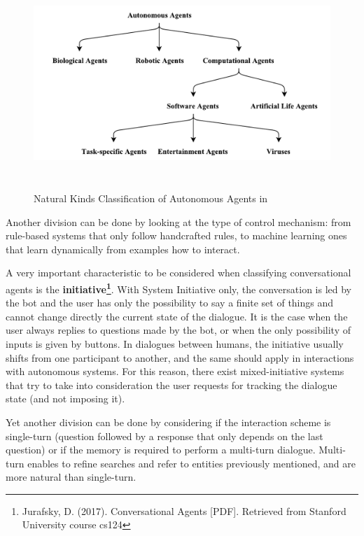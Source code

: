 
\begin{figure}[!htbp]
    \centering
    \includegraphics[max width=\linewidth,max height=8cm,keepaspectratio]{figures/franklinClassification}
    \caption{Natural Kinds Classification of Autonomous Agents in~\cite{franklin1996agent}}\label{fig:franklinClassification}
\end{figure}

Another division can be done by looking at the type of control mechanism: from rule-based systems that only follow handcrafted rules, to machine learning ones that learn dynamically from examples how to interact.

A very important characteristic to be considered when classifying conversational agents is the \textbf{initiative\footnote{ Jurafsky, D. (2017). Conversational Agents [PDF]. Retrieved from Stanford University course cs124 }}. With System Initiative only, the conversation is led by the bot and the user has only the possibility to say a finite set of things and cannot change directly the current state of the dialogue. It is the case when the user always replies to questions made by the bot, or when the only possibility of inputs is given by buttons. In dialogues between humans, the initiative usually shifts from one participant to another, and the same should apply in interactions with autonomous systems. For this reason, there exist mixed-initiative systems that try to take into consideration the user requests for tracking the dialogue state (and not imposing it).

Yet another division can be done by considering if the interaction scheme is single-turn (question followed by a response that only depends on the last question) or if the memory is required to perform a multi-turn dialogue. Multi-turn enables to refine searches and refer to entities previously mentioned, and are more natural than single-turn.

